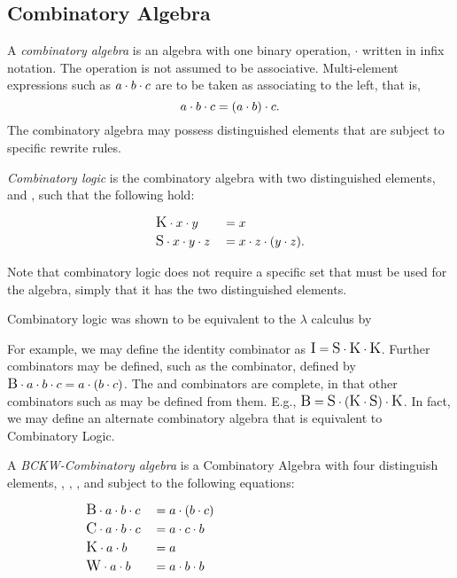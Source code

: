 \subsection{Combinatory Algebra} %
\label{sub:combinatory_algebra}

\begin{definition}\label{def:combinatory_algebra}
  A \emph{combinatory algebra} is an algebra with one binary operation, $\cdot$ written in infix
  notation. The operation is not assumed to be associative. Multi-element expressions such as 
  $a \. b \. c$ are to be taken as associating to the left, that is,
  \[
    a \. b \. c = (a \.b)\.c.
  \]
  The combinatory algebra may possess distinguished elements that are subject to 
  specific rewrite rules.
\end{definition}

\begin{definition}\label{def:combinatory_logic}
  \emph{Combinatory logic} is the combinatory algebra with two distinguished elements, \Kc and \Sc,
  such that the following hold:
  \begin{singlespace}
    \begin{align*}
      &\Kc \cdot x \cdot y &&= x\\
      &\Sc \cdot x \cdot y \cdot z &&= x \cdot z \cdot (y \cdot z).
    \end{align*}
  \end{singlespace}
\end{definition}

Note that combinatory logic does not require a specific set that must be used for the algebra,
simply that it has the two distinguished elements. 

Combinatory logic was shown to be equivalent to the $\lambda$ calculus by 

For example, we may define the identity combinator \Ic as $\Ic = \Sc \. \Kc \. \Kc$. 
Further combinators may be defined, such as the \Bc combinator, defined by
$\Bc \. a \. b \. c = a \. (b\. c)$. The \Sc and \Kc combinators are complete, in that other
combinators such as \Bc may be defined from them. E.g., $\Bc = \Sc\.(\Kc\.\Sc)\.\Kc$. 
In fact, we may define an alternate combinatory algebra that is equivalent to Combinatory Logic.

\begin{definition}\label{def:bckw_algebra}
  A \emph{BCKW-Combinatory algebra} is a Combinatory Algebra with four distinguish elements, 
  \Bc, \Cc, \Kc, and \Wc subject to the following equations:
  \begin{singlespace}
    \begin{align*}
      &\Bc \. a\.b\.c   &&=a\.(b\.c)&\qquad\qquad\qquad\qquad\qquad\qquad\\
      &\Cc \. a\.b\.c   &&=a\.c\.b\\
      &\Kc \. a\.b      &&=a\\
      &\Wc\. a\.b       && = a\.b\.b
    \end{align*}
  \end{singlespace}
\end{definition}

